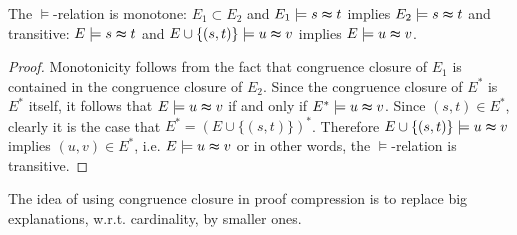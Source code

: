 \begin{proposition}
\label{prop:models}
The $\models$-relation is monotone: $E_1 \subset E_2$ and $E_1 \models s \thickapprox t$ implies $E_2 \models s \thickapprox t$ and transitive: $E \models s \thickapprox t$ and $E \cup \{(s,t)\} \models u \thickapprox v$ implies $E \models u \thickapprox v$. 

\end{proposition}

\begin{proof}

Monotonicity follows from the fact that congruence closure of $E_1$ is contained in the congruence closure of $E_2$.
Since the congruence closure of $E^*$ is $E^*$ itself, it follows that $E \models u \thickapprox v$ if and only if $E^* \models u \thickapprox v$.
Since $(s,t) \in E^*$, clearly it is the case that $E^* = (E \cup \{(s,t)\})^*$.
Therefore $E \cup \{(s,t)\} \models u \thickapprox v$ implies $(u,v) \in E^*$, i.e. $E \models u \thickapprox v$ or in other words, the $\models$-relation is transitive.

\end{proof}

The idea of using congruence closure in proof compression is to replace big explanations, w.r.t. cardinality, by smaller ones.